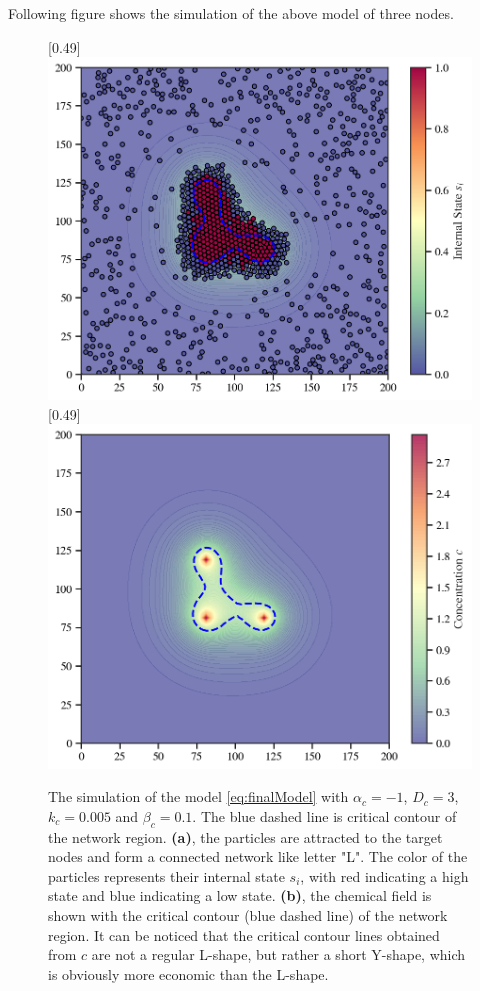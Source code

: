 \documentclass{article}
\begin{document}
Following figure shows the simulation of the above model of three nodes.
\begin{figure}[htbp]
    \centering
    [0.49\linewidth]{
      \includegraphics[width=\linewidth]{figs/simpleModeling3.png}
    }
    \hfill
    [0.49\linewidth]{
      \includegraphics[width=\linewidth]{figs/simpleModeling4.png}
    }
    \caption{
        The simulation of the model \eqref{eq:finalModel} with $\alpha_c=-1$, $D_c=3$, $k_c=0.005$ and $\beta_c=0.1$. The blue dashed line is critical contour of the network region.
        \textbf{(a)}, the particles are attracted to the target nodes and form a connected network like letter "L". The color of the particles represents their internal state $s_i$, with red indicating a high state and blue indicating a low state.
        \textbf{(b)}, the chemical field is shown with the critical contour (blue dashed line) of the network region. It can be noticed that the critical contour lines obtained from $c$ are not a regular L-shape, but rather a short Y-shape, which is obviously more economic than the L-shape.
    }
\end{figure}
\end{document}
